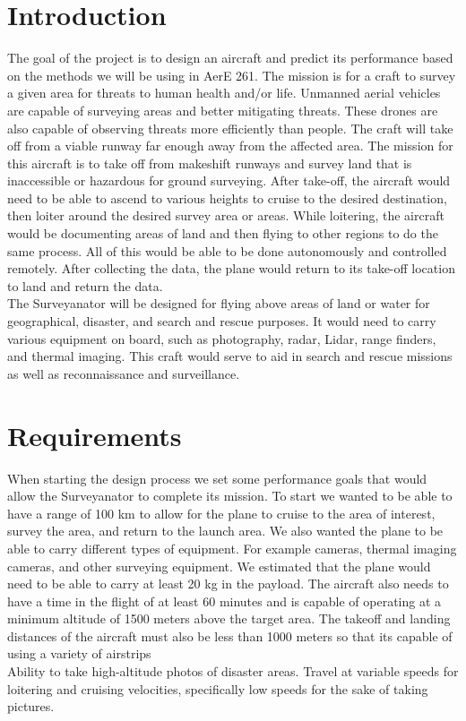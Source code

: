 \documentclass[12pt,A4paper]{article}
\begin{document}
	\section{Introduction}
	\indent The goal of the project is to design an aircraft and predict its performance based on the methods we will be using in AerE 261. The mission is for a craft to survey a given area for threats to human health and/or life. Unmanned aerial vehicles are capable of surveying areas and better mitigating threats. These drones are also capable of observing threats more efficiently than people. The craft will take off from a viable runway far enough away from the affected area. The mission for this aircraft is to take off from makeshift runways and survey land that is inaccessible or hazardous for ground surveying. After take-off, the aircraft would need to be able to ascend to various heights to cruise to the desired destination, then loiter around the desired survey area or areas. While loitering, the aircraft would be documenting areas of land and then flying to other regions to do the same process. All of this would be able to be done autonomously and controlled remotely. After collecting the data, the plane would return to its take-off location to land and return the data. \\
	\indent The Surveyanator will be designed for flying above areas of land or water for geographical, disaster, and search and rescue purposes. It would need to carry various equipment on board, such as photography, radar, Lidar, range finders, and thermal imaging. This craft would serve to aid in search and rescue missions as well as reconnaissance and surveillance.

	\clearpage
	\section{Requirements}
	\indent When starting the design process we set some performance goals that would allow the Surveyanator to complete its mission. To start we wanted to be able to have a range of 100 km to allow for the plane to cruise to the area of interest, survey the area, and return to the launch area. We also wanted the plane to be able to carry different types of equipment. For example cameras, thermal imaging cameras, and other surveying equipment. We estimated that the plane would need to be able to carry at least 20 kg in the payload. The aircraft also needs to have a time in the flight of at least 60 minutes and is capable of operating at a minimum altitude of 1500 meters above the target area. The takeoff and landing distances of the aircraft must also be less than 1000 meters so that its capable of using a variety of airstrips \\
	\indent Ability to take high-altitude photos of disaster areas. Travel at variable speeds for loitering and cruising velocities, specifically low speeds for the sake of taking pictures.
\end{document}
